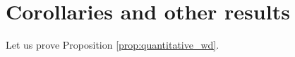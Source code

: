 \documentclass[oneside,a4paper,11pt,notitlepage]{article}
\newcommand{\abs}[1]{{\left|#1\right|}}
\theoremstyle{definition}
\theoremstyle{plain}
\theoremstyle{definition}
\begin{document}

\section{Corollaries and other results}Let us prove Proposition \ref{prop:quantitative_wd}.
\end{document}
